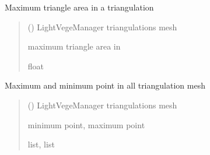 \documentclass[letterpaper,10pt,english]{sphinxmanual}
\begin{document}
\begin{fulllineitems}
\label{\detokenize{reference:trianglesmesh.compute_area_max}}
\pysigstartsignatures
{}
\pysigstopsignatures
\sphinxAtStartPar
Maximum triangle area in a triangulation
\begin{quote}\begin{description}
\sphinxAtStartPar
{} () \textendash{} LightVegeManager triangulations mesh

\sphinxAtStartPar
maximum triangle area in 

\sphinxAtStartPar
float

\end{description}\end{quote}

\end{fulllineitems}


\begin{fulllineitems}
\label{\detokenize{reference:trianglesmesh.compute_minmax_coord}}
\pysigstartsignatures
{}
\pysigstopsignatures
\sphinxAtStartPar
Maximum and minimum point in all triangulation mesh
\begin{quote}\begin{description}
\sphinxAtStartPar
{} () \textendash{} LightVegeManager triangulations mesh

\sphinxAtStartPar
minimum point, maximum point

\sphinxAtStartPar
list, list

\end{description}\end{quote}

\end{fulllineitems}
\end{document}
